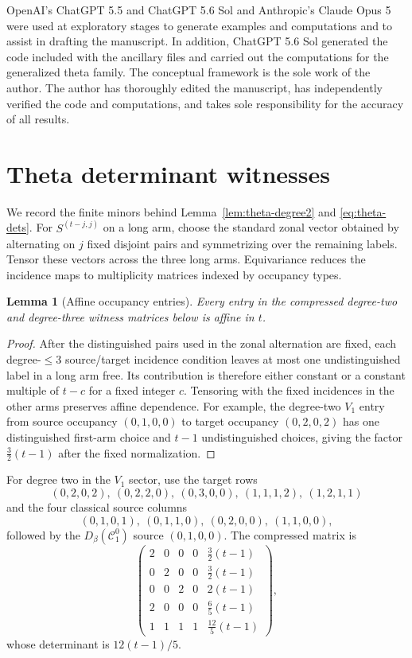 \documentclass[11pt]{amsart}
\newtheorem{lem}[thm]{Lemma}
\theoremstyle{definition}
\theoremstyle{remark}
\newcommand{\cc}{\mathcal}
\begin{document}
OpenAI's ChatGPT 5.5 and ChatGPT 5.6 Sol and Anthropic's Claude Opus 5 were used at exploratory stages to generate examples and computations and to assist in drafting the manuscript. In addition, ChatGPT 5.6 Sol generated the code included with the ancillary files and carried out the computations for the generalized theta family. The conceptual framework is the sole work of the author. The author has thoroughly edited the manuscript, has independently verified the code and computations, and takes sole responsibility for the accuracy of all results.

\appendix


\section{Theta determinant witnesses}\label{app:theta-ledger}

We record the finite minors behind Lemma~\ref{lem:theta-degree2} and \eqref{eq:theta-dets}.  For $S^{(t-j,j)}$ on a long arm, choose the standard zonal vector obtained by alternating on $j$ fixed disjoint pairs and symmetrizing over the remaining labels.  Tensor these vectors across the three long arms.  Equivariance reduces the incidence maps to multiplicity matrices indexed by occupancy types.

\begin{lem}[Affine occupancy entries]\label{lem:affine-occupancy}
Every entry in the compressed degree-two and degree-three witness matrices below is affine in $t$.
\end{lem}

\begin{proof}
After the distinguished pairs used in the zonal alternation are fixed, each degree-$\le3$ source/target incidence condition leaves at most one undistinguished label in a long arm free.  Its contribution is therefore either constant or a constant multiple of $t-c$ for a fixed integer $c$.  Tensoring with the fixed incidences in the other arms preserves affine dependence.  For example, the degree-two $V_1$ entry from source occupancy $(0,1,0,0)$ to target occupancy $(0,2,0,2)$ has one distinguished first-arm choice and $t-1$ undistinguished choices, giving the factor $\frac32(t-1)$ after the fixed normalization.
\end{proof}

For degree two in the $V_1$ sector, use the target rows
\[
(0,2,0,2),\ (0,2,2,0),\ (0,3,0,0),\ (1,1,1,2),\ (1,2,1,1)
\]
and the four classical source columns
\[
(0,1,0,1),\ (0,1,1,0),\ (0,2,0,0),\ (1,1,0,0),
\]
followed by the $D_\beta(\cc C_1^0)$ source $(0,1,0,0)$.  The compressed matrix is
\[
\begin{pmatrix}
2&0&0&0&\frac32(t-1)\\
0&2&0&0&\frac32(t-1)\\
0&0&2&0&2(t-1)\\
2&0&0&0&\frac65(t-1)\\
1&1&1&1&\frac{12}{5}(t-1)
\end{pmatrix},
\]
whose determinant is $12(t-1)/5$.
\end{document}
